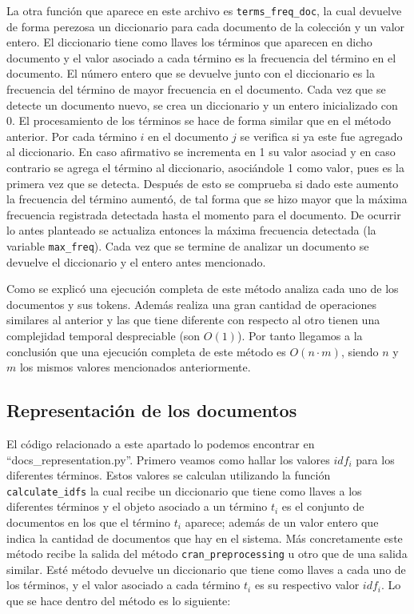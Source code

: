 \documentclass[runningheads]{llncs}
\begin{document}
	La otra funci\'on que aparece en este archivo es \verb|terms_freq_doc|, la cual devuelve de forma perezosa un diccionario para cada documento de la colecci\'on y un valor entero. El diccionario tiene como llaves los t\'erminos que aparecen en dicho documento y el valor asociado a cada t\'ermino es la frecuencia del t\'ermino en el documento. El n\'umero entero que se devuelve junto con el diccionario es la frecuencia del t\'ermino de mayor frecuencia en el documento. Cada vez que se detecte un documento nuevo, se crea un diccionario y un entero inicializado con 0. El procesamiento de los t\'erminos se hace de forma similar que en el m\'etodo anterior. Por cada t\'ermino $i$ en el documento $j$ se verifica si ya este fue agregado al diccionario. En caso afirmativo se incrementa en 1 su valor asociad y en caso contrario se agrega el t\'ermino al diccionario, asoci\'andole 1 como valor, pues es la primera vez que se detecta. Despu\'es de esto se comprueba si dado este aumento la frecuencia del t\'ermino aument\'o, de tal forma que se hizo mayor que la m\'axima frecuencia registrada detectada hasta el momento para el documento. De ocurrir lo antes planteado se actualiza entonces la m\'axima frecuencia detectada (la variable \verb|max_freq|). Cada vez que se termine de analizar un documento se devuelve el diccionario y el entero antes mencionado.
	
	Como se explic\'o una ejecuci\'on completa de este m\'etodo analiza cada uno de los documentos y sus tokens. Adem\'as realiza una gran cantidad de operaciones similares al anterior y las que tiene diferente con respecto al otro tienen una complejidad temporal despreciable (son $O(1)$). Por tanto llegamos a la conclusi\'on que una ejecuci\'on completa de este m\'etodo es $O(n\cdot m)$, siendo $n$ y $m$ los mismos valores mencionados anteriormente.
	
	\subsection{Representaci\'on de los documentos}
	
	El c\'odigo relacionado a este apartado lo podemos encontrar en ``docs\_representation.py''. Primero veamos como hallar los valores $idf_i$ para los diferentes t\'erminos. Estos valores se calculan utilizando la funci\'on \verb|calculate_idfs| la cual recibe un diccionario que tiene como llaves a los diferentes t\'erminos y el objeto asociado a un t\'ermino $t_i$ es el conjunto de documentos en los que el t\'ermino $t_i$ aparece; adem\'as de un valor entero que indica la cantidad de documentos que hay en el sistema. M\'as concretamente este m\'etodo recibe la salida del m\'etodo \verb|cran_preprocessing| u otro que de una salida similar. Est\'e m\'etodo devuelve un diccionario que tiene como llaves a cada uno de los t\'erminos, y el valor asociado a cada t\'ermino $t_i$ es su respectivo valor $idf_i$. Lo que se hace dentro del m\'etodo es lo siguiente: 
\end{document}
